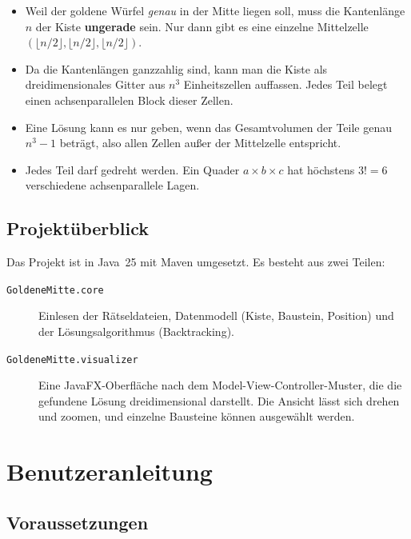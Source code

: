 \documentclass[11pt,a4paper,parskip=half]{scrartcl}
\newcommand{\code}[1]{\texttt{#1}}
\begin{document}
\begin{itemize}
  \item Weil der goldene Würfel \emph{genau} in der Mitte liegen soll, muss die
        Kantenlänge $n$ der Kiste \textbf{ungerade} sein. Nur dann gibt es eine
        einzelne Mittelzelle $\left(\lfloor n/2\rfloor, \lfloor n/2\rfloor,
        \lfloor n/2\rfloor\right)$.
  \item Da die Kantenlängen ganzzahlig sind, kann man die Kiste als
        dreidimensionales Gitter aus $n^3$ Einheitszellen auffassen. Jedes Teil
        belegt einen achsenparallelen Block dieser Zellen.
  \item Eine Lösung kann es nur geben, wenn das Gesamtvolumen der Teile genau
        $n^3 - 1$ beträgt, also allen Zellen außer der Mittelzelle entspricht.
  \item Jedes Teil darf gedreht werden. Ein Quader $a\times b\times c$ hat höchstens
        $3! = 6$ verschiedene achsenparallele Lagen.
\end{itemize}

\subsection{Projektüberblick}

Das Projekt ist in Java~25 mit Maven umgesetzt. Es besteht aus zwei Teilen:
\begin{description}
  \item[\code{GoldeneMitte.core}] Einlesen der Rätseldateien, Datenmodell
        (Kiste, Baustein, Position) und der Lösungsalgorithmus
        (Backtracking).
  \item[\code{GoldeneMitte.visualizer}] Eine JavaFX-Oberfläche nach dem
        Model-View-Controller-Muster, die die gefundene Lösung dreidimensional
        darstellt. Die Ansicht lässt sich drehen und zoomen, und einzelne Bausteine
        können ausgewählt werden.
\end{description}

\section{Benutzeranleitung}

\subsection{Voraussetzungen}
\end{document}
